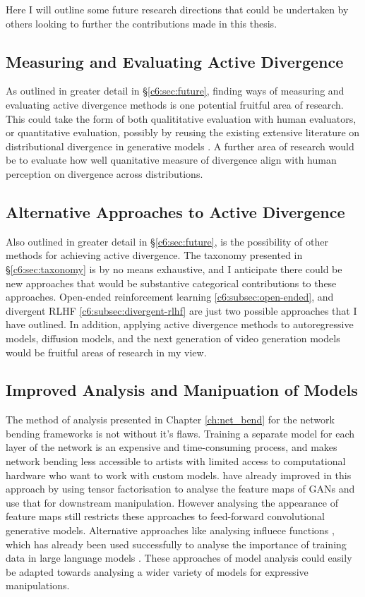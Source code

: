 Here I will outline some future research directions that could be undertaken by others looking to further the contributions made in this thesis.

\subsection{Measuring and Evaluating Active Divergence}
As outlined in greater detail in \S \ref{c6:sec:future}, finding ways of measuring and evaluating active divergence methods is one potential fruitful area of research. 
This could take the form of both qualititative evaluation with human evaluators, or quantitative evaluation, possibly by reusing the existing extensive literature on distributional divergence in generative models \citep{gretton2019interpretable}.
A further area of research would be to evaluate how well quanitative measure of divergence align with human perception on divergence across distributions.

\subsection{Alternative Approaches to Active Divergence}
Also outlined in greater detail in \S \ref{c6:sec:future}, is the possibility of other methods for achieving active divergence. 
The taxonomy presented in \S \ref{c6:sec:taxonomy} is by no means exhaustive, and I anticipate there could be new approaches that would be substantive categorical contributions to these approaches. 
Open-ended reinforcement learning \ref{c6:subsec:open-ended}, and divergent RLHF \ref{c6:subsec:divergent-rlhf} are just two possible approaches that I have outlined. 
In addition, applying active divergence methods to autoregressive models, diffusion models, and the next generation of video generation models would be fruitful areas of research in my view.

\subsection{Improved Analysis and Manipuation of Models}

The method of analysis presented in Chapter \ref{ch:net_bend} for the network bending frameworks is not without it's flaws.
Training a separate model for each layer of the network is an expensive and time-consuming process, and makes network bending less accessible to artists with limited access to computational hardware who want to work with custom models.
\cite{oldfield2022panda,oldfield2024bilinear} have already improved in this approach by using tensor factorisation to analyse the feature maps of GANs and use that for downstream manipulation.
However analysing the appearance of feature maps still restricts these approaches to feed-forward convolutional generative models.
Alternative approaches like analysing influece functions \citep{koh2017understanding}, which has already been used successfully to analyse the importance of training data in large language models \citep{choe2024your}.
These approaches of model analysis could easily be adapted towards analysing a wider variety of models for expressive manipulations.

